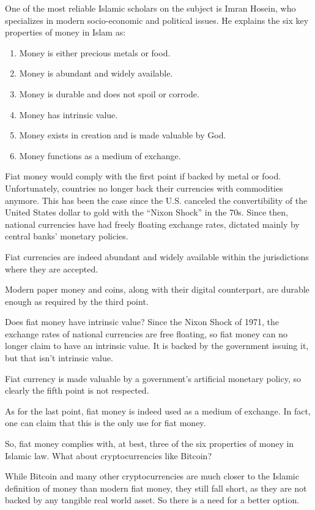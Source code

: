 \documentclass[letterpaper,11pt]{article}
\begin{document}
One of the most reliable Islamic scholars on the subject is Imran Hosein\cite{hosein}, who specializes in modern socio-economic and political issues. He explains the six key properties of money in Islam as:

\begin{enumerate}
	\item Money is either precious metals or food.
	\item Money is abundant and widely available.
	\item Money is durable and does not spoil or corrode.
	\item Money has intrinsic value.
	\item Money exists in creation and is made valuable by God.
	\item Money functions as a medium of exchange.
\end{enumerate}

Fiat money would comply with the first point if backed by metal or food. Unfortunately, countries no longer back their currencies with commodities anymore. This has been the case since the U.S. canceled the convertibility of the United States dollar to gold with the “Nixon Shock” in the 70s\cite{nixon}. Since then, national currencies have had freely floating exchange rates, dictated mainly by central banks’ monetary policies\cite{jeffrey}.

Fiat currencies are indeed abundant and widely available within the jurisdictions where they are accepted.

Modern paper money and coins, along with their digital counterpart, are durable enough as required by the third point.

Does fiat money have intrinsic value? Since the Nixon Shock of 1971, the exchange rates of national currencies are free floating, so fiat money can no longer claim to have an intrinsic value. It is backed by the government issuing it, but that isn’t intrinsic value.

Fiat currency is made valuable by a government’s artificial monetary policy, so clearly the fifth point is not respected.

As for the last point, fiat money is indeed used as a medium of exchange. In fact, one can claim that this is the only use for fiat money.

So, fiat money complies with, at best, three of the six properties of money in Islamic law. What about cryptocurrencies like Bitcoin?

While Bitcoin and many other cryptocurrencies are much closer to the Islamic definition of money than modern fiat money, they still fall short, as they are not backed by any tangible real world asset. So there is a need for a better option.
\end{document}
